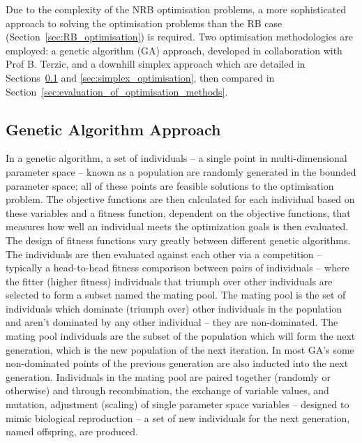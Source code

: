 \documentclass[../main.tex]{subfiles}
\begin{document}
Due to the complexity of the NRB optimisation problems, a more sophisticated approach to solving the optimisation problems than the RB case (Section~\ref{sec:RB_optimisation}) is required. Two optimisation methodologies are employed: a genetic algorithm (GA) approach, developed in collaboration with Prof B. Terzic, and a downhill simplex approach which are detailed in Sections~\ref{sec:genetic_algorithm_optimisation} and \ref{sec:simplex_optimisation}, then compared in Section~\ref{sec:evaluation_of_optimisation_methods}.

\subsection{Genetic Algorithm Approach}
\label{sec:genetic_algorithm_optimisation}
In a genetic algorithm, a set of individuals -- a single point in multi-dimensional parameter space -- known as a population are randomly generated in the bounded parameter space; all of these points are feasible solutions to the optimisation problem. The objective functions are then calculated for each individual based on these variables and a fitness function, dependent on the objective functions, that measures how well an individual meets the optimization goals \cite{hofler2013innovative} is then evaluated. The design of fitness functions vary greatly between different genetic algorithms. The individuals are then evaluated against each other via a competition -- typically a head-to-head fitness comparison between pairs of individuals -- where the fitter (higher fitness) individuals that triumph over other individuals are selected to form a subset named the mating pool. The mating pool is the set of individuals which dominate (triumph over) other individuals in the population and aren't dominated by any other individual -- they are non-dominated. The mating pool individuals are the subset of the population which will form the next generation, which is the new population of the next iteration. In most GA's some non-dominated points of the previous generation are also inducted into the next generation. Individuals in the mating pool are paired together (randomly or otherwise) and through recombination, the exchange of variable values, and mutation, adjustment (scaling) of single parameter space variables \cite{hofler2013innovative} -- designed to mimic biological reproduction -- a set of new individuals for the next generation, named offspring, are produced.
\end{document}
